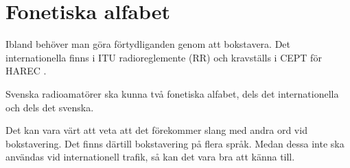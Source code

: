 \section{Fonetiska alfabet}
\label{fonetiska_alfabet}

Ibland behöver man göra förtydliganden genom att bokstavera.
Det internationella finns i ITU radioreglemente (RR) \cite[Appendix 14]{ITU-RR}
och kravställs i CEPT för HAREC \cite[Annex 6]{TR6102}.

Svenska radioamatörer ska kunna två fonetiska alfabet, dels det
internationella och dels det svenska.

Det kan vara värt att veta att det förekommer slang med andra ord vid
bokstavering.
Det finns därtill bokstavering på flera språk.
Medan dessa inte ska användas vid internationell trafik, så kan det vara bra
att känna till.

